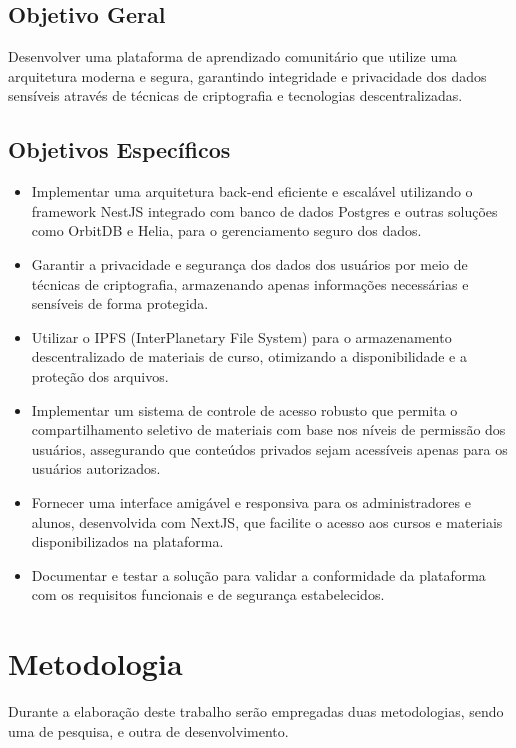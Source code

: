 \subsection{Objetivo Geral}

Desenvolver uma plataforma de aprendizado comunitário que utilize uma arquitetura moderna e segura, garantindo integridade e privacidade dos dados sensíveis através de técnicas de criptografia e tecnologias descentralizadas.

\subsection{Objetivos Específicos}

\begin{itemize}
    \item Implementar uma arquitetura back-end eficiente e escalável utilizando o framework NestJS integrado com banco de dados Postgres e outras soluções como OrbitDB e Helia, para o gerenciamento seguro dos dados.
    \item Garantir a privacidade e segurança dos dados dos usuários por meio de técnicas de criptografia, armazenando apenas informações necessárias e sensíveis de forma protegida.
    \item Utilizar o IPFS (InterPlanetary File System) para o armazenamento descentralizado de materiais de curso, otimizando a disponibilidade e a proteção dos arquivos.
    \item Implementar um sistema de controle de acesso robusto que permita o compartilhamento seletivo de materiais com base nos níveis de permissão dos usuários, assegurando que conteúdos privados sejam acessíveis apenas para os usuários autorizados.
    \item Fornecer uma interface amigável e responsiva para os administradores e alunos, desenvolvida com NextJS, que facilite o acesso aos cursos e materiais disponibilizados na plataforma.
    \item Documentar e testar a solução para validar a conformidade da plataforma com os requisitos funcionais e de segurança estabelecidos.
\end{itemize}

\section{Metodologia}

Durante a elaboração deste trabalho serão empregadas duas metodologias, sendo uma de pesquisa, e outra de desenvolvimento.

